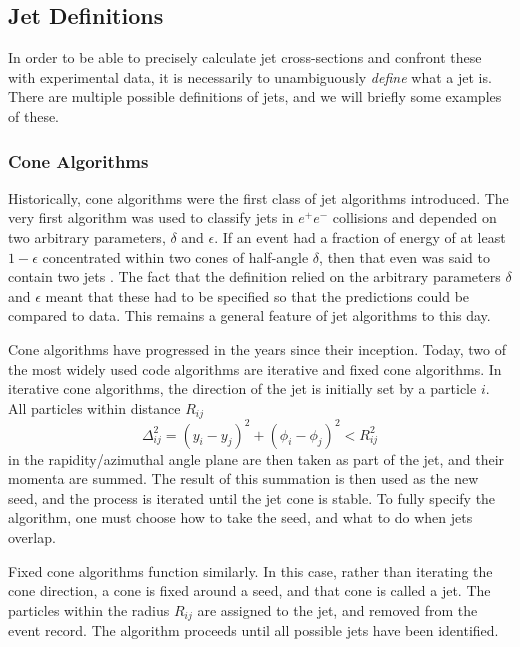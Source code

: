\documentclass[10pt,a4paper]{book}
\begin{document}
\subsection{Jet Definitions}
In order to be able to precisely calculate jet cross-sections and confront these with experimental data, it is necessarily to unambiguously \emph{define} what a jet is. There are multiple possible definitions of jets, and we will briefly some examples of these.  

\subsubsection{Cone Algorithms}
Historically, cone algorithms were the first class of jet algorithms introduced. The very first algorithm was used to classify jets in $e^+e^-$ collisions and depended on two arbitrary parameters, $\delta$ and $\epsilon$. If an event had a fraction of energy of at least $1 - \epsilon$ concentrated within two cones of half-angle $\delta$, then that even was said to contain two jets \cite{Sterman:1977wj}. The fact that the definition relied on the arbitrary parameters $\delta$ and $\epsilon$ meant that these had to be specified so that the predictions could be compared to data. This remains a general feature of jet algorithms to this day.

Cone algorithms have progressed in the years since their inception. Today, two of the most widely used code algorithms are iterative and fixed cone algorithms. In iterative cone algorithms, the direction of the jet is initially set by a particle $i$. All particles within distance $R_{ij}$
\begin{equation}
\Delta_{ij}^2 = (y_i - y_j)^2 + (\phi_i - \phi_j)^2 < R_{ij}^2 
\end{equation}
in the rapidity/azimuthal angle plane are then taken as part of the jet, and their momenta are summed. The result of this summation is then used as the new seed, and the process is iterated until the jet cone is stable. To fully specify the algorithm, one must choose how to take the seed, and what to do when jets overlap. 

Fixed cone algorithms function similarly. In this case, rather than iterating the cone direction, a cone is fixed around a seed, and that cone is called a jet. The particles within the radius $R_{ij}$ are assigned to the jet, and removed from the event record. The algorithm proceeds until all possible jets have been identified.
\end{document}
